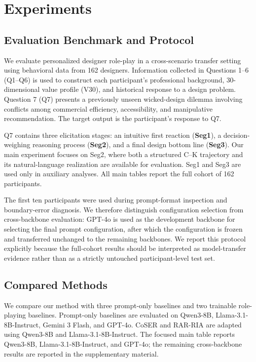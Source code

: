 \section{Experiments}
\label{sec:experiments}

\subsection{Evaluation Benchmark and Protocol}
\label{sec:evaluation_protocol}

We evaluate personalized designer role-play in a cross-scenario transfer
setting using behavioral data from 162 designers. Information collected in
Questions 1--6 (Q1--Q6) is used to construct each participant's professional
background, 30-dimensional value profile (V30), and historical response to a
design problem. Question 7 (Q7) presents a previously unseen wicked-design
dilemma involving conflicts among commercial efficiency, accessibility, and
manipulative recommendation. The target output is the participant's response
to Q7.

Q7 contains three elicitation stages: an intuitive first reaction
(\textbf{Seg1}), a decision-weighing reasoning process (\textbf{Seg2}), and a
final design bottom line (\textbf{Seg3}). Our main experiment focuses on Seg2,
where both a structured C--K trajectory and its natural-language realization
are available for evaluation. Seg1 and Seg3 are used only in auxiliary
analyses. All main tables report the full cohort of 162 participants.

The first ten participants were used during prompt-format inspection and
boundary-error diagnosis. We therefore distinguish configuration selection
from cross-backbone evaluation: GPT-4o is used as the development backbone for
selecting the final prompt configuration, after which the configuration is
frozen and transferred unchanged to the remaining backbones. We report this
protocol explicitly because the full-cohort results should be interpreted as
model-transfer evidence rather than as a strictly untouched participant-level
test set.

\subsection{Compared Methods}
\label{sec:baselines}

We compare our method with three prompt-only baselines and two trainable role-playing
baselines. Prompt-only baselines are evaluated on Qwen3-8B,
Llama-3.1-8B-Instruct, Gemini 3 Flash, and GPT-4o. CoSER and RAR-RIA are
adapted using Qwen3-8B and Llama-3.1-8B-Instruct. The focused main table
reports Qwen3-8B, Llama-3.1-8B-Instruct, and GPT-4o; the remaining
cross-backbone results are reported in the supplementary material.

